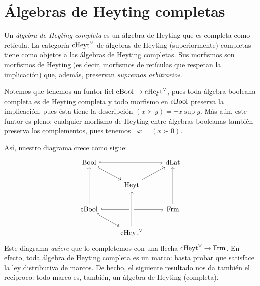 \section{Álgebras de Heyting completas}

\begin{definition}\label{heyt}
  Un \emph{álgebra de Heyting completa} es un álgebra de Heyting que es
  completa como retícula.
  La categoría $\mathrm{cHeyt}^\vee$ de álgebras de Heyting (superiormente)
  completas tiene como objetos a las álgebras de Heyting completas.
  Sus morfismos son morfismos de Heyting (es decir, morfismos de
  retículas que respetan la implicación) que, además, preservan
  \emph{supremos arbitrarios}.
\end{definition}

Notemos que tenemos un funtor fiel $\mathrm{cBool}\to\mathrm{cHeyt}^\vee$, pues toda
álgebra booleana completa es de Heyting completa y todo
morfismo en $\mathrm{cBool}$ preserva la implicación, pues ésta tiene la
descripción $(x\succ y)=\neg x\sup y$.
Más aún, este funtor es pleno: cualquier morfismo de Heyting
entre álgebras booleanas también preserva los complementos, pues
tenemos $\neg x = (x\succ 0)$.

Así, nuestro diagrama crece como sigue:
\begin{equation}\label{diag:prisma-cheyt-incompleto}
\begin{tikzcd}
  \Bool \ar[dr,hook] \ar[rr,hook] &               & \DLat \\
                                  & \Heyt \ar[ur]         \\
  \CBA \ar[uu] \ar[rr,hook] \ar[dr,hook] & & \Frm \ar[uu]    \\
                            & \cHeyt \ar[uu,crossing over]
\end{tikzcd}
\end{equation}
Este diagrama \emph{quiere} que lo completemos con una flecha
$\mathrm{cHeyt}^\vee\to\mathrm{Frm}$. En efecto, toda álgebra de Heyting completa es un
marco: basta probar que satisface la ley distributiva de marcos. De
hecho, el siguiente resultado nos da también el recíproco: todo marco
es, también, un álgebra de Heyting (completa).

